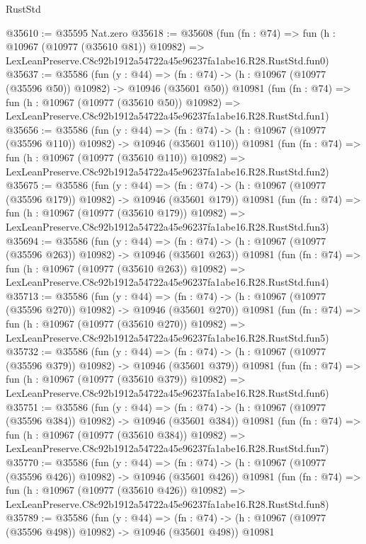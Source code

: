 \begin{lexlean}{RustStd}
\begin{coremodule}
@35610 := @35595 Nat.zero
@35618 := @35608
    (fun (fn : @74) =>
    fun (h : @10967 (@10977 (@35610 @81)) @10982) =>
    LexLeanPreserve.C8c92b1912a54722a45e96237fa1abe16.R28.RustStd.fun0)
@35637 := @35586
    (fun (y : @44) =>
    (fn : @74) -> (h : @10967 (@10977 (@35596 @50)) @10982) -> @10946 (@35601 @50))
    @10981
    (fun (fn : @74) =>
    fun (h : @10967 (@10977 (@35610 @50)) @10982) =>
    LexLeanPreserve.C8c92b1912a54722a45e96237fa1abe16.R28.RustStd.fun1)
@35656 := @35586
    (fun (y : @44) =>
    (fn : @74) -> (h : @10967 (@10977 (@35596 @110)) @10982) -> @10946 (@35601 @110))
    @10981
    (fun (fn : @74) =>
    fun (h : @10967 (@10977 (@35610 @110)) @10982) =>
    LexLeanPreserve.C8c92b1912a54722a45e96237fa1abe16.R28.RustStd.fun2)
@35675 := @35586
    (fun (y : @44) =>
    (fn : @74) -> (h : @10967 (@10977 (@35596 @179)) @10982) -> @10946 (@35601 @179))
    @10981
    (fun (fn : @74) =>
    fun (h : @10967 (@10977 (@35610 @179)) @10982) =>
    LexLeanPreserve.C8c92b1912a54722a45e96237fa1abe16.R28.RustStd.fun3)
@35694 := @35586
    (fun (y : @44) =>
    (fn : @74) -> (h : @10967 (@10977 (@35596 @263)) @10982) -> @10946 (@35601 @263))
    @10981
    (fun (fn : @74) =>
    fun (h : @10967 (@10977 (@35610 @263)) @10982) =>
    LexLeanPreserve.C8c92b1912a54722a45e96237fa1abe16.R28.RustStd.fun4)
@35713 := @35586
    (fun (y : @44) =>
    (fn : @74) -> (h : @10967 (@10977 (@35596 @270)) @10982) -> @10946 (@35601 @270))
    @10981
    (fun (fn : @74) =>
    fun (h : @10967 (@10977 (@35610 @270)) @10982) =>
    LexLeanPreserve.C8c92b1912a54722a45e96237fa1abe16.R28.RustStd.fun5)
@35732 := @35586
    (fun (y : @44) =>
    (fn : @74) -> (h : @10967 (@10977 (@35596 @379)) @10982) -> @10946 (@35601 @379))
    @10981
    (fun (fn : @74) =>
    fun (h : @10967 (@10977 (@35610 @379)) @10982) =>
    LexLeanPreserve.C8c92b1912a54722a45e96237fa1abe16.R28.RustStd.fun6)
@35751 := @35586
    (fun (y : @44) =>
    (fn : @74) -> (h : @10967 (@10977 (@35596 @384)) @10982) -> @10946 (@35601 @384))
    @10981
    (fun (fn : @74) =>
    fun (h : @10967 (@10977 (@35610 @384)) @10982) =>
    LexLeanPreserve.C8c92b1912a54722a45e96237fa1abe16.R28.RustStd.fun7)
@35770 := @35586
    (fun (y : @44) =>
    (fn : @74) -> (h : @10967 (@10977 (@35596 @426)) @10982) -> @10946 (@35601 @426))
    @10981
    (fun (fn : @74) =>
    fun (h : @10967 (@10977 (@35610 @426)) @10982) =>
    LexLeanPreserve.C8c92b1912a54722a45e96237fa1abe16.R28.RustStd.fun8)
@35789 := @35586
    (fun (y : @44) =>
    (fn : @74) -> (h : @10967 (@10977 (@35596 @498)) @10982) -> @10946 (@35601 @498))
    @10981

\end{coremodule}
\end{lexlean}
